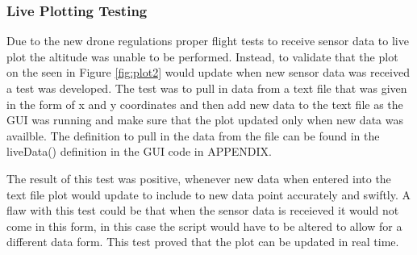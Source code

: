 \subsubsection{Live Plotting Testing}
Due to the new drone regulations proper flight tests to receive sensor data to live plot the altitude was unable to be performed. Instead, to validate that the plot on the seen in Figure \ref{fig:plot2} would update when new sensor data was received a test was developed. The test was to pull in data from a text file that was given in the form of x and y coordinates and then add new data to the text file as the GUI was running and make sure that the plot updated only when new data was availble. The definition to pull in the data from the file can be found in the liveData() definition in the GUI code in APPENDIX.

The result of this test was positive, whenever new data when entered into the text file plot would update to include to new data point accurately and swiftly. A flaw with this test could be that when the sensor data is receieved it would not come in this form, in this case the script would have to be altered to allow for a different data form. This test proved that the plot can be updated in real time.

